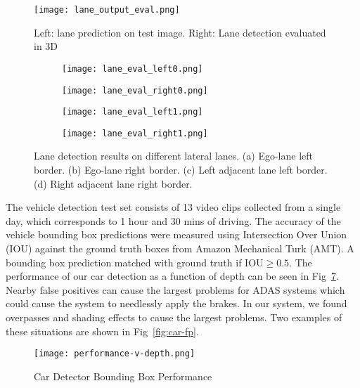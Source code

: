 \documentclass[journal]{IEEEtran}
\begin{document}
\begin{figure}[tb]
  \centering
    \texttt{[image: lane\_output\_eval.png]}
 \caption{Left: lane prediction on test image. Right: Lane detection evaluated in 3D}
 \label{fig:lane-output-eval}
\end{figure}

\begin{figure}[tb]
  \centering
    \begin{subfigure}[b]{1.6in}
      \texttt{[image: lane\_eval\_left0.png]}
      \caption{}
      \label{fig:lane-eval-left0}
    \end{subfigure}%
    \begin{subfigure}[b]{1.6in}
      \texttt{[image: lane\_eval\_right0.png]}
      \caption{}
      \label{fig:lane-eval-right0}
    \end{subfigure}%

    \begin{subfigure}[b]{1.6in}%
      \texttt{[image: lane\_eval\_left1.png]}
      \caption{}
      \label{fig:lane-eval-left1}
    \end{subfigure}%
    \begin{subfigure}[b]{1.6in}%
      \texttt{[image: lane\_eval\_right1.png]}
      \caption{}
      \label{fig:lane-eval-right1}
    \end{subfigure}%
 \caption{Lane detection results on different lateral lanes. (a) Ego-lane left border. (b) Ego-lane right border. (c) Left adjacent lane left border. (d) Right adjacent lane right border.}
 \label{fig:lane-eval-plot}
\end{figure}

The vehicle detection test set consists of 13 video clips collected from a single day, which corresponds to 1 hour and 30 mins of driving. The accuracy of the vehicle bounding box predictions were measured using Intersection Over Union (IOU) against the ground truth boxes from Amazon Mechanical Turk (AMT). A bounding box prediction matched with ground truth if IOU$\geq0.5$. The performance of our car detection as a function of depth can be seen in Fig~\ref{fig:car-bb-error}. Nearby false positives can cause the largest problems for ADAS systems which could cause the system to needlessly apply the brakes. In our system, we found overpasses and shading effects to cause the largest problems. Two examples of these situations are shown in Fig~\ref{fig:car-fp}.

\begin{figure}[tb]
  \centering
    \texttt{[image: performance-v-depth.png]}
 \caption{Car Detector Bounding Box Performance}
 \label{fig:car-bb-error}
\end{figure}
\end{document}
